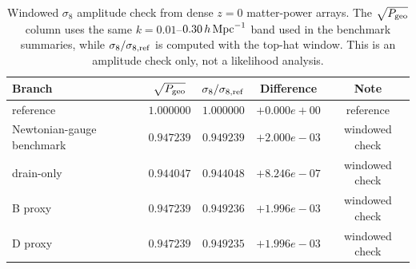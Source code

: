 \begin{table}[t]
\centering
\begin{tabular}{lcccc}
\toprule
Branch & $\sqrt{P_{\rm geo}}$ & $\sigma_8/\sigma_{8,\rm ref}$ & Difference & Note \\
\midrule
reference & $1.000000$ & $1.000000$ & $+0.000e+00$ & reference \\
Newtonian-gauge benchmark & $0.947239$ & $0.949239$ & $+2.000e-03$ & windowed check \\
drain-only & $0.944047$ & $0.944048$ & $+8.246e-07$ & windowed check \\
B proxy & $0.947239$ & $0.949236$ & $+1.996e-03$ & windowed check \\
D proxy & $0.947239$ & $0.949235$ & $+1.996e-03$ & windowed check \\
\bottomrule
\end{tabular}
\caption{Windowed $\sigma_8$ amplitude check from dense $z=0$ matter-power arrays. The $\sqrt{P_{\rm geo}}$ column uses the same $k=0.01$--$0.30\,h\,{\rm Mpc}^{-1}$ band used in the benchmark summaries, while $\sigma_8/\sigma_{8,\rm ref}$ is computed with the top-hat window. This is an amplitude check only, not a likelihood analysis.}
\label{tab:sigma8_window_check}
\end{table}